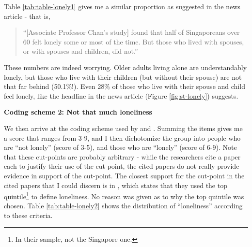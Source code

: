 \documentclass[openany]{book}
\let\rmarkdownfootnote\footnote%
\def\footnote{\protect\rmarkdownfootnote}
\begin{document}
Table \ref{tab:table-lonely1} gives me a similar proportion as suggested
in the news article - that is,

\begin{quote}
``{[}Associate Professor Chan's study{]} found that half of Singaporeans
over 60 felt lonely some or most of the time. But those who lived with
spouses, or with spouses and children, did not.''
\end{quote}

 These numbers are indeed worrying. Older adults living alone are
understandably lonely, but those who live with their children (but
without their spouse) are not that far behind (50.1\%!). Even 28\% of
those who live with their spouse and child feel lonely, like the
headline in the news article (Figure \ref{fig:st-lonely}) suggests.

\textbf{Coding scheme 2: Not that much loneliness}

We then arrive at the coding scheme used by \citet{wee_loneliness_2019}
and \citet{ge_social_2017}. Summing the items gives me a score that
ranges from 3-9, and I then dichotomize the group into people who are
``not lonely'' (score of 3-5), and those who are ``lonely'' (score of
6-9). Note that these cut-points are probably arbitrary - while the
researchers cite a paper each to justify their use of the cut-point, the
cited papers do not really provide evidence in support of the cut-point.
The closest support for the cut-point in the cited papers that I could
discern is in \citet{steptoe_social_2013}, which states that they used
the top quintile\footnote{In their sample, not the Singapore one.} to
define loneliness. No reason was given as to why the top quintile was
chosen. Table \ref{tab:table-lonely2} shows the distribution of
``loneliness'' according to these criteria.
\end{document}
